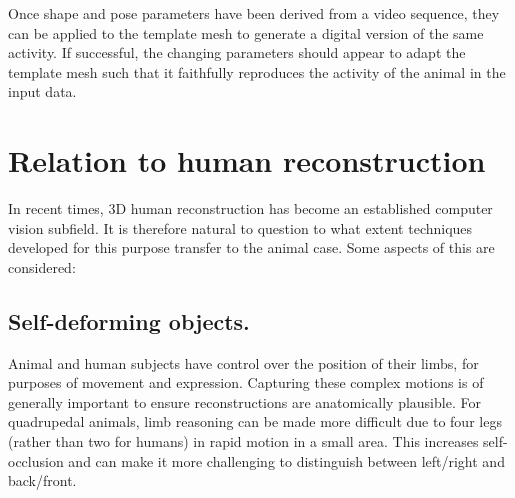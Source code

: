 Once shape and pose parameters have been derived from a video sequence, they can be applied to the template mesh to generate a digital version of the same activity. If successful, the changing parameters should appear to adapt the template mesh such that it faithfully reproduces the activity of the animal in the input data. 


\section{Relation to human reconstruction}
In recent times, 3D human reconstruction has become an established computer vision subfield. It is therefore natural to question to what extent techniques developed for this purpose transfer to the animal case. Some aspects of this are considered:



\subsection{Self-deforming objects.} Animal and human subjects have control over the position of their limbs, for purposes of movement and expression. Capturing these complex motions is of generally important to ensure reconstructions are anatomically plausible. For quadrupedal animals, limb reasoning can be made more difficult due to four legs (rather than two for humans) in rapid motion in a small area. This increases self-occlusion and can make it more challenging to distinguish between left/right and back/front.

